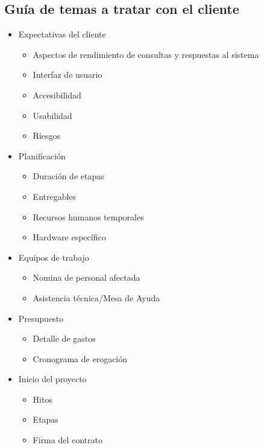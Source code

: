 \subsection{Guía de temas a tratar con el cliente}
\begin{itemize}
\item Expectativas del cliente
	\begin{itemize}
		\item Aspectos de rendimiento de consultas y respuestas al sistema
		\item Interfaz de usuario
		\item Accesibilidad
        \item Usabilidad
		\item Riesgos
	\end{itemize}
\item Planificación
	\begin{itemize}
		\item Duración de etapas
        \item Entregables
        \item Recursos humanos temporales
        \item Hardware específico
	\end{itemize}
\item Equipos de trabajo
	\begin{itemize}
		\item Nomina de personal afectada
		\item Asistencia técnica/Mesa de Ayuda
	\end{itemize}
\item Presupuesto
	\begin{itemize}
		\item Detalle de gastos
		\item Cronograma de erogación
	\end{itemize}
\item Inicio del proyecto
	\begin{itemize}
		\item Hitos
		\item Etapas
		\item Firma del contrato
	\end{itemize}
\end{itemize}

